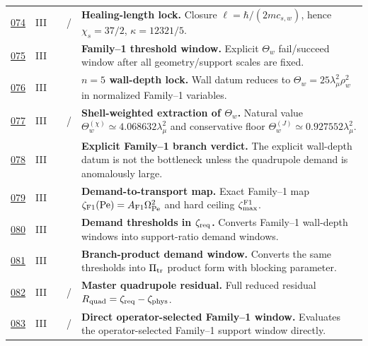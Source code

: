 {\begin{longtable}{@{}L{0.055\textwidth}L{0.075\textwidth}L{0.145\textwidth}L{0.235\textwidth}L{0.43\textwidth}@{}}
\addlinespace
\hyperref[stage:074]{074} & III &  & \StatusReduced{} / \StatusExactClosure{} & \textbf{Healing-length lock.} Closure \(\ell=\hbar/(2mc_{s,w})\), hence \(\chi_s=37/2\), \(\kappa=12321/5\). \\
\addlinespace
\hyperref[stage:075]{075} & III &  & \StatusExactClosure{} & \textbf{Family--1 threshold window.} Explicit \(\Theta_w\) fail/succeed window after all geometry/support scales are fixed. \\
\addlinespace
\hyperref[stage:076]{076} & III &  & \StatusExactClosure{} & \textbf{\(n=5\) wall-depth lock.} Wall datum reduces to \(\Theta_w=25\lambda_\mu^2\rho_w^2\) in normalized Family--1 variables. \\
\addlinespace
\hyperref[stage:077]{077} & III &  & \StatusReduced{} / \StatusNumerical{} & \textbf{Shell-weighted extraction of \(\Theta_w\).} Natural value \(\Theta_w^{(\chi)}\simeq4.068632\lambda_\mu^2\) and conservative floor \(\Theta_w^{(J)}\simeq0.927552\lambda_\mu^2\). \\
\addlinespace
\hyperref[stage:078]{078} & III &  & \StatusExactClosure{} & \textbf{Explicit Family--1 branch verdict.} The explicit wall-depth datum is not the bottleneck unless the quadrupole demand is anomalously large. \\
\addlinespace
\hyperref[stage:079]{079} & III &  & \StatusExactClosure{} & \textbf{Demand-to-transport map.} Exact Family--1 map \(\zeta_{\rm F1}(\mathrm{Pe})=A_{\rm F1}\Omega_{\mathrm{Pe}}^2\) and hard ceiling \(\zeta_{\max}^{\rm F1}\). \\
\addlinespace
\hyperref[stage:080]{080} & III &  & \StatusExactClosure{} & \textbf{Demand thresholds in \(\zeta_{\rm req}\).} Converts Family--1 wall-depth windows into support-ratio demand windows. \\
\addlinespace
\hyperref[stage:081]{081} & III &  & \StatusExactClosure{} & \textbf{Branch-product demand window.} Converts the same thresholds into \(\Pi_{\rm tr}\) product form with blocking parameter. \\
\addlinespace
\hyperref[stage:082]{082} & III &  & \StatusExactClosure{} / \StatusOpen{} & \textbf{Master quadrupole residual.} Full reduced residual \(R_{\rm quad}=\zeta_{\rm req}-\zeta_{\rm phys}\). \\
\addlinespace
\hyperref[stage:083]{083} & III &  & \StatusExactClosure{} / \StatusNumerical{} & \textbf{Direct operator-selected Family--1 window.} Evaluates the operator-selected Family--1 support window directly. \\

\end{longtable}}
